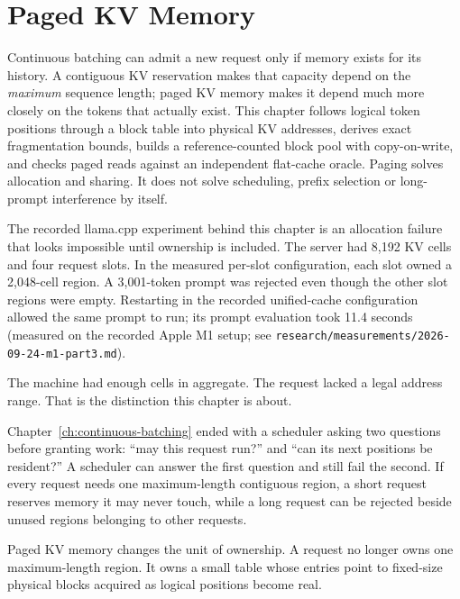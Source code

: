 \chapter{Paged KV Memory}\label{ch:paged-kv}

\begin{ChapterIntent}
Continuous batching can admit a new request only if memory exists for its
history. A contiguous KV reservation makes that capacity depend on the
\emph{maximum} sequence length; paged KV memory makes it depend much more
closely on the tokens that actually exist. This chapter follows logical token
positions through a block table into physical KV addresses, derives exact
fragmentation bounds, builds a reference-counted block pool with copy-on-write,
and checks paged reads against an independent flat-cache oracle. Paging solves
allocation and sharing. It does not solve scheduling, prefix selection or
long-prompt interference by itself.
\end{ChapterIntent}


The recorded llama.cpp experiment behind this chapter is an allocation failure
that looks impossible until ownership is included. The server had 8,192 KV
cells and four request slots. In the measured per-slot configuration, each slot
owned a 2,048-cell region. A 3,001-token prompt was rejected even though the
other slot regions were empty. Restarting in the recorded unified-cache
configuration allowed the same prompt to run; its prompt evaluation took
11.4 seconds (measured on the recorded Apple M1 setup; see
\texttt{research/measurements/2026-09-24-m1-part3.md}).

The machine had enough cells in aggregate. The request lacked a legal address
range. That is the distinction this chapter is about.

Chapter~\ref{ch:continuous-batching} ended with a scheduler asking two
questions before granting work: ``may this request run?'' and ``can its next
positions be resident?'' A scheduler can answer the first question and still
fail the second. If every request needs one maximum-length contiguous region,
a short request reserves memory it may never touch, while a long request can
be rejected beside unused regions belonging to other requests.

Paged KV memory changes the unit of ownership. A request no longer owns one
maximum-length region. It owns a small table whose entries point to fixed-size
physical blocks acquired as logical positions become real.

